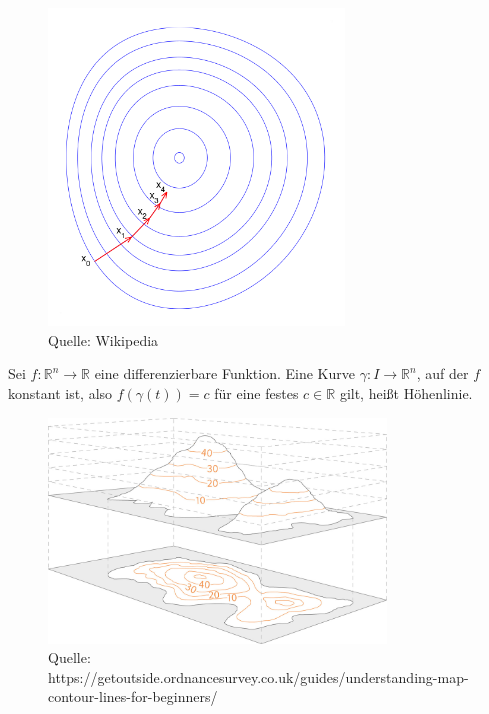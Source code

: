 \begin{figure}[H]
      \centering
    \includegraphics[width=0.7\textwidth]{images/Gradient_descent}
      \caption{Quelle: Wikipedia}
\end{figure}



\begin{Definition}
Sei  $f: \mathbb{R}^n \to \mathbb{R}$  eine differenzierbare Funktion. Eine Kurve $\gamma : I \to \mathbb{R}^n$, auf der $f$ konstant ist, also 
$f(\gamma(t)) = c$ für eine festes $c \in \mathbb{R}$ gilt, heißt Höhenlinie.
\end{Definition}

\begin{figure}[H]
      \centering
    \includegraphics[width=0.8\textwidth]{images/Contours-and-relief}
      \caption{Quelle: https://getoutside.ordnancesurvey.co.uk/guides/understanding-map-contour-lines-for-beginners/}
\end{figure}


